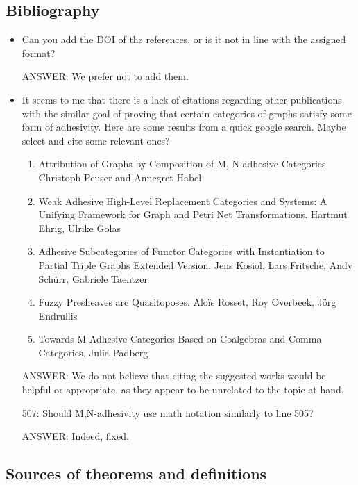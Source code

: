 \documentclass[english,11pt,a4paper]{article}
\begin{document}
\subsection*{Bibliography}
\begin{itemize}
	\item  Can you add the DOI of the references, or is it not in line with the assigned format?
	
	ANSWER: We prefer not to add them.
	
	\item It seems to me that there is a lack of citations regarding other publications with the similar goal of proving that certain categories of graphs satisfy some form of adhesivity. Here are some results from a quick google search. Maybe select and cite some relevant ones?
	\begin{enumerate}
		\item  Attribution of Graphs by Composition of M, N-adhesive Categories. Christoph Peuser and Annegret Habel
		\item Weak Adhesive High-Level Replacement Categories and Systems: A Unifying Framework for Graph and Petri Net Transformations. Hartmut Ehrig, Ulrike Golas
		\item Adhesive Subcategories of Functor Categories with Instantiation to Partial Triple Graphs Extended Version. Jens Kosiol, Lars Fritsche, Andy Schürr, Gabriele Taentzer
		\item  Fuzzy Presheaves are Quasitoposes. Aloïs Rosset, Roy Overbeek, Jörg Endrullis
		\item  Towards M-Adhesive Categories Based on Coalgebras and Comma Categories. Julia Padberg
	\end{enumerate}
	
	ANSWER: We do not believe that citing the suggested works would be helpful or appropriate, as they appear to be unrelated to the topic at hand.
	
	507: Should M,N-adhesivity use math notation similarly to line 505?
	
	ANSWER: Indeed, fixed.
	
	
\end{itemize}

\subsection*{Sources of theorems and definitions}
\end{document}
